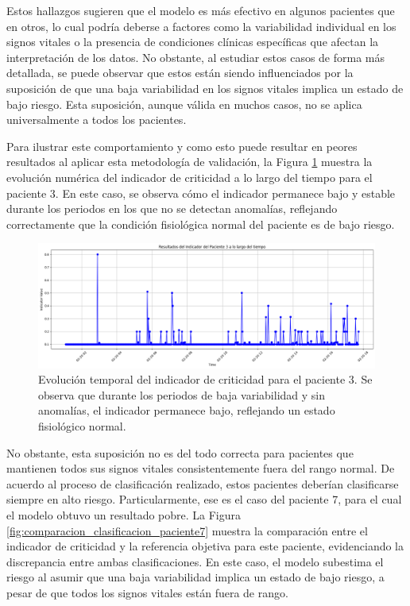 Estos hallazgos sugieren que el modelo es más efectivo en algunos pacientes que en otros, lo cual podría deberse a factores como la variabilidad individual en los signos vitales o la presencia de condiciones clínicas específicas que afectan la interpretación de los datos. No obstante, al estudiar estos casos de forma más detallada, se puede observar que estos están siendo influenciados por la suposición de que una baja variabilidad en los signos vitales implica un estado de bajo riesgo. Esta suposición, aunque válida en muchos casos, no se aplica universalmente a todos los pacientes.

Para ilustrar este comportamiento y como esto puede resultar en peores resultados al aplicar esta metodología de validación, la Figura \ref{fig:indicador_tiempo_paciente3} muestra la evolución numérica del indicador de criticidad a lo largo del tiempo para el paciente 3. En este caso, se observa cómo el indicador permanece bajo y estable durante los periodos en los que no se detectan anomalías, reflejando correctamente que la condición fisiológica normal del paciente es de bajo riesgo.

\begin{figure}[H]
  \centering
  \includegraphics[width=\textwidth]{Images/indicador_de_criticidad_cambio.png}
  \caption{Evolución temporal del indicador de criticidad para el paciente 3. Se observa que durante los periodos de baja variabilidad y sin anomalías, el indicador permanece bajo, reflejando un estado fisiológico normal.}
  \label{fig:indicador_tiempo_paciente3}
\end{figure}

No obstante, esta suposición no es del todo correcta para pacientes que mantienen todos sus signos vitales consistentemente fuera del rango normal. De acuerdo al proceso de clasificación realizado, estos pacientes deberían clasificarse siempre en alto riesgo. Particularmente, ese es el caso del paciente 7, para el cual el modelo obtuvo un resultado pobre. La Figura \ref{fig:comparacion_clasificacion_paciente7} muestra la comparación entre el indicador de criticidad y la referencia objetiva para este paciente, evidenciando la discrepancia entre ambas clasificaciones. En este caso, el modelo subestima el riesgo al asumir que una baja variabilidad implica un estado de bajo riesgo, a pesar de que todos los signos vitales están fuera de rango.

